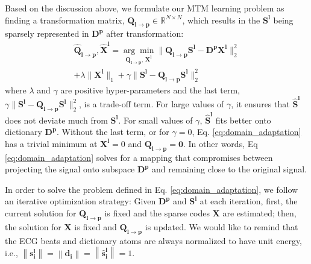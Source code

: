 \documentclass[journal,transmag]{IEEEtran}
\begin{document}
Based on the discussion above, we formulate our MTM learning problem as finding a transformation matrix, $\bm{Q_{l \rightarrow p}}  \in \mathbb{R}^{N \times N}$, which results in the $\bm{S^l}$ being sparsely represented in $\bm{D^p}$ after transformation: 
\begin{multline}
    \bm{\hat{Q}_{l \rightarrow p}}, \bm{\hat{X}^l} = \underset{\bm{Q_{l \rightarrow p}},\,\bm{X^l}}{\arg\min} \|\bm{Q_{l \rightarrow p}S^l} - \bm{D^pX^l}\|_2^2 \\ + \lambda \|\bm{X^l}\|_1 + \gamma\|\bm{S^l} - \bm{Q_{l \rightarrow p}S^l}\|_2^2 \label{eq:domain_adaptation}
\end{multline}
where $\lambda$ and $\gamma$ are positive hyper-parameters and the last term, $\gamma\|\bm{S^l} - \bm{Q_{l \rightarrow p}S^l}\|_2^2$, is a trade-off term. For large values of $\gamma$, it ensures that $\bm{\widehat{S}^l}$ does not deviate much from $\bm{S^l}$. For small values of $\gamma$, $\bm{\widehat{S}^l}$ fits better onto dictionary $\bm{D^p}$. Without the last term, or for $\gamma = 0$, Eq. \eqref{eq:domain_adaptation} has a trivial minimum at $\bm{X^l} = 0$ and $\bm{Q_{l \rightarrow p} = 0}$. In other words, Eq \eqref{eq:domain_adaptation} solves for a mapping that compromises between projecting the signal onto subspace $\bm{D^p}$ and remaining close to the original signal.

In order to solve the problem defined in Eq. \eqref{eq:domain_adaptation}, we follow an iterative optimization strategy: Given $\bm{D^p}$ and $\bm{S^l}$ at each iteration, first, the current solution for $\bm{Q_{l \rightarrow p}}$ is fixed and the sparse codes $\bm{X}$ are estimated; then, the solution for $\bm{X}$ is fixed and $\bm{Q_{l \rightarrow p}}$ is updated. We would like to remind that the ECG beats and dictionary atoms are always normalized to have unit energy, i.e., $\left\| \bm{s^l_i} \right\| = \left\| \bm{d_i} \right\| = \left\|\bm{\widehat{s}^l_i}\right\|=1$. 
\end{document}
